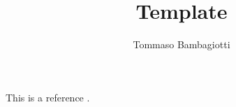 \documentclass[11pt]{article}
\title{Template}
\author{Tommaso Bambagiotti}
\begin{document}
	\maketitle
	This is a reference \cite{art}.	
	\clearpage %

	
	

	\newpage
	\appendix
	\appendixpage
	
	\newpage

	\printbibliography

	\newpage
\end{document}
